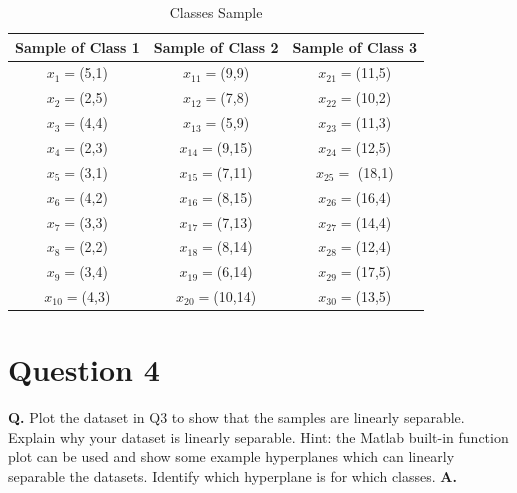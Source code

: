 \documentclass[12pt]{report}
\begin{document}
\begin{table}[H]
	\centering
	\begin{tabular}{|c | c | c|}
		\hline
		Sample of Class 1 & Sample of Class 2 & Sample of Class 3 \\ [0.5ex]
		\hline\hline
		$x_{1}=$(5,1)     & $x_{11}=$(9,9)    & $x_{21}=$(11,5)   \\
		\hline
		$x_{2}=$(2,5)     & $x_{12}=$(7,8)    & $x_{22}=$(10,2)   \\
		\hline
		$x_{3}=$(4,4)     & $x_{13}=$(5,9)    & $x_{23}=$(11,3)   \\
		\hline
		$x_{4}=$(2,3)     & $x_{14}=$(9,15)   & $x_{24}=$(12,5)   \\
		\hline
		$x_{5}=$(3,1)     & $x_{15}=$(7,11)   & $x_{25}=$ (18,1)  \\
		\hline
		$x_{6}=$(4,2)     & $x_{16}=$(8,15)   & $x_{26}=$(16,4)   \\
		\hline
		$x_{7}=$(3,3)     & $x_{17}=$(7,13)   & $x_{27}=$(14,4)   \\
		\hline
		$x_{8}=$(2,2)     & $x_{18}=$(8,14)   & $x_{28}=$(12,4)   \\
		\hline
		$x_{9}=$(3,4)     & $x_{19}=$(6,14)   & $x_{29}=$(17,5)   \\
		\hline
		$x_{10}=$(4,3)    & $x_{20}=$(10,14)  & $x_{30}=$(13,5)   \\
		\hline
	\end{tabular}
	\caption{Classes Sample}
\end{table}

\section{Question 4}

\textbf{Q.} Plot the dataset in Q3 to show that the samples are linearly separable. Explain
why your dataset is linearly separable. Hint: the Matlab built-in function
plot can be used and show some example hyperplanes which can linearly separable
the datasets. Identify which hyperplane is for which classes.\newline\newline
\textbf{A.}
\end{document}
